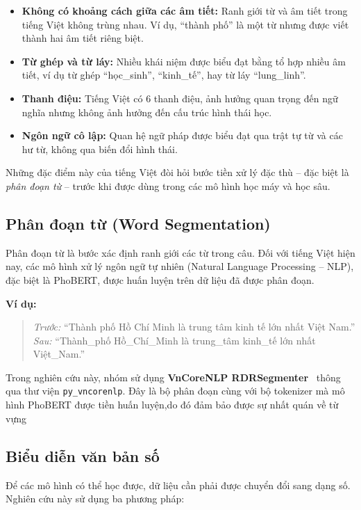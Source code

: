\documentclass[12pt, a4paper]{report}
\newcommand{\phobert}{PhoBERT\xspace}
\begin{document}
\begin{itemize}[leftmargin=2em]
  \item \textbf{Không có khoảng cách giữa các âm tiết:} Ranh giới từ và âm tiết trong tiếng Việt không trùng nhau. Ví dụ, ``thành phố'' là một từ nhưng được viết thành hai âm tiết riêng biệt.
  \item \textbf{Từ ghép và từ láy:} Nhiều khái niệm được biểu đạt bằng tổ hợp nhiều âm tiết, ví dụ từ ghép ``học\_sinh'', ``kinh\_tế'', hay từ láy ``lung\_linh''.
  \item \textbf{Thanh điệu:} Tiếng Việt có 6 thanh điệu, ảnh hưởng quan trọng đến ngữ nghĩa nhưng không ảnh hưởng đến cấu trúc hình thái học.
  \item \textbf{Ngôn ngữ cô lập:} Quan hệ ngữ pháp được biểu đạt qua trật tự từ và các hư từ, không qua biến đổi hình thái.
\end{itemize}

Những đặc điểm này của tiếng Việt đòi hỏi bước tiền xử lý đặc thù -- đặc biệt là \textit{phân đoạn từ} -- trước khi được dùng trong các mô hình học máy và học sâu.

\subsection{Phân đoạn từ (Word Segmentation)}

Phân đoạn từ là bước xác định ranh giới các từ trong câu. Đối với tiếng Việt hiện nay, các mô hình xử lý ngôn ngữ tự nhiên (Natural Language Processing -- NLP), đặc biệt là PhoBERT, được huấn luyện trên dữ liệu đã được phân đoạn.

\textbf{Ví dụ:}
\begin{quote}
\textit{Trước:} ``Thành phố Hồ Chí Minh là trung tâm kinh tế lớn nhất Việt Nam.''\\
\textit{Sau:} ``Thành\_phố Hồ\_Chí\_Minh là trung\_tâm kinh\_tế lớn nhất Việt\_Nam.''
\end{quote}

Trong nghiên cứu này, nhóm sử dụng \textbf{VnCoreNLP RDRSegmenter}~\cite{nguyen2018vncorenlp} thông qua thư viện \texttt{py\_vncorenlp}. Đây là bộ phân đoạn cùng với bộ tokenizer mà mô hình \phobert được tiền huấn luyện,do đó đảm bảo được sự nhất quán về từ vựng

\subsection{Biểu diễn văn bản số}

Để các mô hình có thể học được, dữ liệu cần phải được chuyển đổi sang dạng số. Nghiên cứu này sử dụng ba phương pháp:
\end{document}

